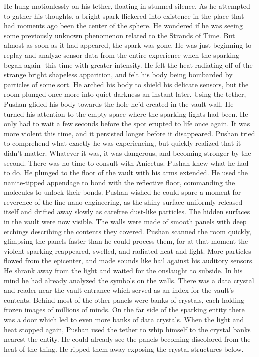 \documentclass[a4paper]{article}
\begin{document}
He hung motionlessly on his tether, floating in stunned silence. As he attempted to gather his thoughts, a bright spark flickered into existence in the place that had moments ago been the center of the sphere. He wondered if he was seeing some previously unknown phenomenon related to the Strands of Time. But almost as soon as it had appeared, the spark was gone.
He was just beginning to replay and analyze sensor data from the entire experience when the sparking began again- this time with greater intensity. He felt the heat radiating off of the strange bright shapeless apparition, and felt his body being bombarded by particles of some sort. He arched his body to shield his delicate sensors, but the room plunged once more into quiet darkness an instant later.
Using the tether, Pushan glided his body towards the hole he’d created in the vault wall. He turned his attention to the empty space where the sparking lights had been. He only had to wait a few seconds before the spot erupted to life once again. It was more violent this time, and it persisted longer before it disappeared. Pushan tried to comprehend what exactly he was experiencing, but quickly realized that it didn’t matter. Whatever it was, it was dangerous, and becoming stronger by the second.
There was no time to consult with Anicetus. Pushan knew what he had to do. He plunged to the floor of the vault with his arms extended. He used the nanite-tipped appendage to bond with the reflective floor, commanding the molecules to unlock their bonds. Pushan wished he could spare a moment for reverence of the fine nano-engineering, as the shiny surface uniformly released itself and drifted away slowly as carefree dust-like particles.
The hidden surfaces in the vault were now visible. The walls were made of smooth panels with deep etchings describing the contents they covered. Pushan scanned the room quickly, glimpsing the panels faster than he could process them, for at that moment the violent sparking reappeared, swelled, and radiated heat and light. More particles flowed from the epicenter, and made sounds like hail against his auditory sensors.
He shrank away from the light and waited for the onslaught to subside. In his mind he had already analyzed the symbols on the walls. There was a data crystal and reader near the vault entrance which served as an index for the vault’s contents. Behind most of the other panels were banks of crystals, each holding frozen images of millions of minds. On the far side of the sparking entity there was a door which led to even more banks of data crystals.
When the light and heat stopped again, Pushan used the tether to whip himself to the crystal banks nearest the entity. He could already see the panels becoming discolored from the heat of the thing. He ripped them away exposing the crystal structures below.
\end{document}
